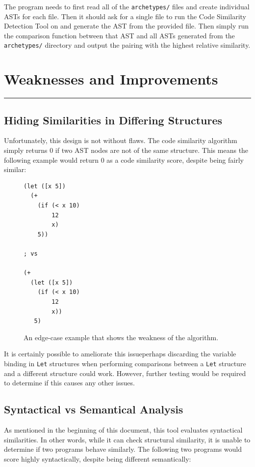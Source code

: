 \documentclass[12pt]{article}
\newcommand{\key}[1]{\texttt{#1}}
\newcommand{\usection}[1]{\section{#1}\hrule\hfill}
\begin{document}
\hfill

The program needs to first read all of the \key{archetypes/} files and create individual ASTs for each file. Then it should ask for a single file to run the Code Similarity Detection Tool on and generate the AST from the provided file. Then simply run the comparison function between that AST and all ASTs generated from the \key{archetypes/} directory and output the pairing with the highest relative similarity.

\usection{Weaknesses and Improvements}

\subsection{Hiding Similarities in Differing Structures}
Unfortunately, this design is not without flaws. The code similarity algorithm simply returns 0 if two AST nodes are not of the same structure. This means the following example would return 0 as a code similarity score, despite being fairly similar:

\begin{figure}[H]
  \begin{mdframed}
    \begin{verbatim}
(let ([x 5])
  (+
    (if (< x 10)
        12
        x)
    5))

; vs

(+
  (let ([x 5])
    (if (< x 10)
        12
        x))
   5)
    \end{verbatim}
  \end{mdframed}
  \caption{An edge-case example that shows the weakness of the algorithm.}
  \label{weak-example}
\end{figure}

It is certainly possible to ameliorate this issue\textemdash perhaps discarding the variable binding in \key{Let} structures when performing comparisons between a \key{Let} structure and a different structure could work. However, further testing would be required to determine if this causes any other issues.

\subsection{Syntactical vs Semantical Analysis}

As mentioned in the beginning of this document, this tool evaluates syntactical similarities. In other words, while it can check structural similarity, it is unable to determine if two programs behave similarly. The following two programs would score highly syntactically, despite being different semantically:
\end{document}
